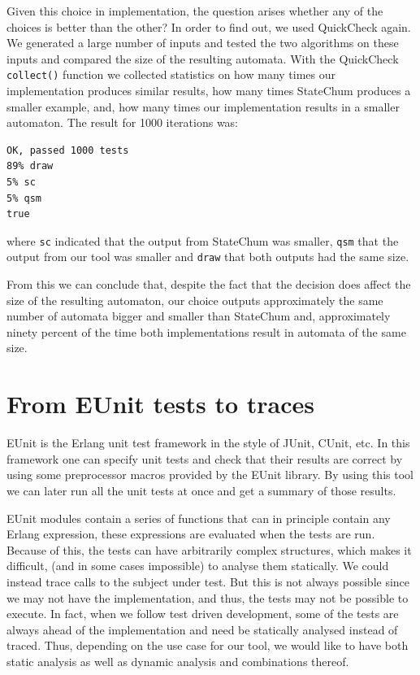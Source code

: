 \documentclass[]{sigplanconf}
\begin{document}
Given this choice in implementation, the question arises whether any of the
choices is better than the other? In order to find out, we used QuickCheck again. 
We generated a large number of inputs
and tested the two algorithms on these inputs and compared the size of
the resulting automata. With the QuickCheck \texttt{collect()} function we
collected statistics on how
many times our implementation produces similar results, how many times StateChum
produces a smaller example, and, how many
times our implementation results in a smaller automaton. The result for 1000
iterations was:

\begin{verbatim}
OK, passed 1000 tests
89% draw
5% sc
5% qsm
true
\end{verbatim}
where \texttt{sc} indicated that the output from StateChum was smaller, \texttt{qsm}
that the output from our tool was smaller and \texttt{draw} that both
outputs had the same size.

From this we can conclude that, despite the fact that the decision does affect the size of
the resulting automaton, our choice
outputs approximately the same number of automata bigger and smaller than
StateChum and, approximately ninety percent of the time both implementations result
in automata of the same size.


\section{From EUnit tests to traces}
\label{EunitToTraces}

EUnit \cite{eunit,eunit_user_guide} is the Erlang unit test framework in the
style of JUnit, CUnit, etc. In this framework one can specify unit tests
and check that their results are correct by using some preprocessor macros
provided by the EUnit library. By using this tool we can later run all
the unit tests at once and get a summary of those results.

EUnit modules contain a series of functions that can in principle
contain any Erlang expression, these expressions are
evaluated when the tests are run. Because of this, the tests
can have arbitrarily complex structures, which makes it difficult, (and
in some cases impossible) to analyse them statically. We could instead
trace calls to the subject under test. But this is not always possible since we may not have
the implementation, and thus, the tests may not be possible to execute.
In fact, when we follow test driven development, some of the tests are always ahead
of the implementation and need be statically analysed instead of traced.
Thus, depending on the use case for our tool, we would
like to have both static analysis as well as dynamic analysis and combinations
thereof. 
\end{document}
